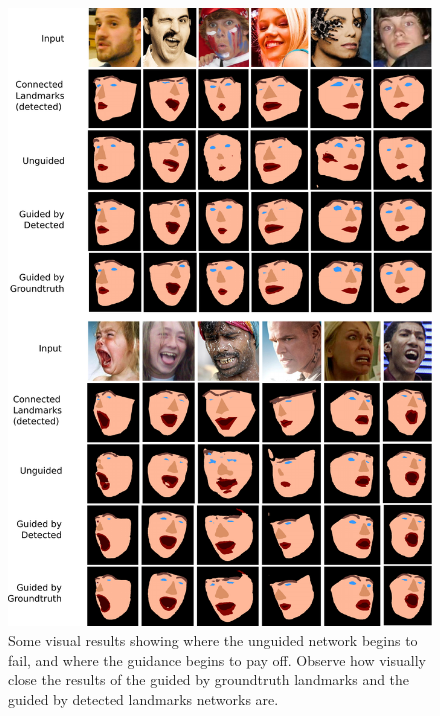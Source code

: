 \begin{figure}
\includegraphics[width=\linewidth]{figs/Visual.pdf}
\caption[Challenging images and their output from facial part
  segmentation]{Some visual results showing where the unguided network
  begins to fail, and where the guidance begins to pay off. Observe
  how visually close the results of the guided by groundtruth
  landmarks and the guided by detected landmarks networks are.}
\label{fig:visual}
\end{figure}

